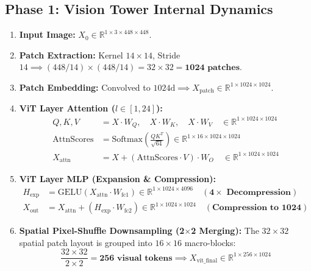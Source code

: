 \documentclass[11pt, a4paper]{article}
\begin{document}
\subsection{Phase 1: Vision Tower Internal Dynamics}
\begin{enumerate}
    \item \textbf{Input Image:} $X_0 \in \mathbb{R}^{1 \times 3 \times 448 \times 448}$.
    \item \textbf{Patch Extraction:} Kernel $14 \times 14$, Stride $14 \implies (448/14) \times (448/14) = 32 \times 32 = \mathbf{1024\text{ patches}}$.
    \item \textbf{Patch Embedding:} Convolved to $1024\text{d} \implies X_{\text{patch}} \in \mathbb{R}^{1 \times 1024 \times 1024}$.
    \item \textbf{ViT Layer Attention ($l \in [1, 24]$):}
    \begin{align*}
        Q, K, V &= X \cdot W_Q, \quad X \cdot W_K, \quad X \cdot W_V \quad \in \mathbb{R}^{1 \times 1024 \times 1024} \\
        \text{AttnScores} &= \text{Softmax}\left(\frac{Q K^T}{\sqrt{64}}\right) \in \mathbb{R}^{1 \times 16 \times 1024 \times 1024} \\
        X_{\text{attn}} &= X + (\text{AttnScores} \cdot V) \cdot W_O \quad \in \mathbb{R}^{1 \times 1024 \times 1024}
    \end{align*}
    \item \textbf{ViT Layer MLP (Expansion \& Compression):}
    \begin{align*}
        H_{\text{exp}} &= \text{GELU}(X_{\text{attn}} \cdot W_{\text{fc1}}) \in \mathbb{R}^{1 \times 1024 \times 4096} \quad (\mathbf{4\times \text{ Decompression}}) \\
        X_{\text{out}} &= X_{\text{attn}} + (H_{\text{exp}} \cdot W_{\text{fc2}}) \in \mathbb{R}^{1 \times 1024 \times 1024} \quad (\mathbf{\text{Compression to } 1024})
    \end{align*}
    \item \textbf{Spatial Pixel-Shuffle Downsampling (2$\times$2 Merging):}
    The $32 \times 32$ spatial patch layout is grouped into $16 \times 16$ macro-blocks:
    \begin{equation}
        \frac{32 \times 32}{2 \times 2} = \mathbf{256\text{ visual tokens}} \implies X_{\text{vit\_final}} \in \mathbb{R}^{1 \times 256 \times 1024}
    \end{equation}
\end{enumerate}
\end{document}
